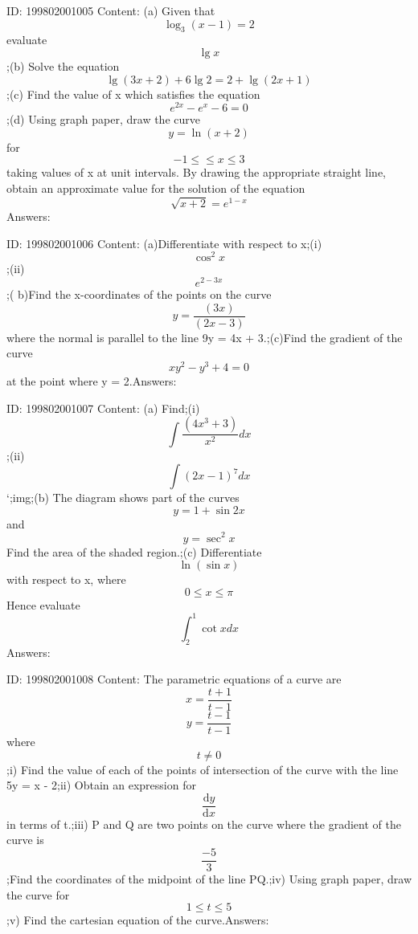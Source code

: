 \documentclass{article}
\begin{document}
ID: 199802001005
Content:
(a) Given that \[\log_3(x-1)=2\] evaluate \[\lg x\];(b) Solve the equation \[\lg (3x + 2) + 6 \lg 2 = 2 + \lg (2x + 1)\];(c)	Find the value of x which satisfies the equation \[e^{2x}-e^x-6=0\];(d) Using graph paper, draw the curve \[y = \ln (x + 2) \]for \[-1\leq \leq x\leq 3\] taking values of x at unit intervals. By drawing the appropriate straight line, obtain an approximate value for the solution of the equation \[\sqrt{x+2}=e^{1-x}\]Answers:

ID: 199802001006
Content:
(a)Differentiate with respect to x;(i) \[\cos^2x\];(ii) \[e^{2-3x}\];( b)Find the x-coordinates of the points on the curve \[y=\frac{(3x)}{(2x-3)}\] where the normal is parallel to the line 9y = 4x + 3.;(c)Find the gradient of the curve \[xy^2-y^3+4=0\] at the point where y = 2.Answers:

ID: 199802001007
Content:
(a) Find;(i) \[\int\frac{(4x^3+3)}{x^2}dx\];(ii) \[\int(2x-1)^7dx\] `;img;(b) The diagram shows part of the curves \[y = 1 + \sin 2x\] and \[y=\sec^2x\] Find the area of the shaded region.;(c) Differentiate \[\ln (\sin x) \] with respect to x, where \[0\leq x\leq \pi\] Hence evaluate \[\int_2^1\cot x dx\]Answers:

ID: 199802001008
Content:
The parametric equations of a curve are \[x=\frac{t+1}{t-1}\] \[y=\frac{t-1}{t-1}\] where  \[t\neq 0\] ;i) Find the value of each of the points of intersection of the curve with the line 5y = x - 2;ii) Obtain an expression for \[\frac{\mathrm{d} y}{\mathrm{d} x}\]in terms of t.;iii) P and Q are two points on the curve where the gradient of the curve is \[\frac{-5}{3}\];Find the coordinates of the midpoint of the line PQ.;iv) Using graph paper, draw the curve for \[1\leq t\leq 5\];v) Find the cartesian equation of the curve.Answers:
\end{document}

